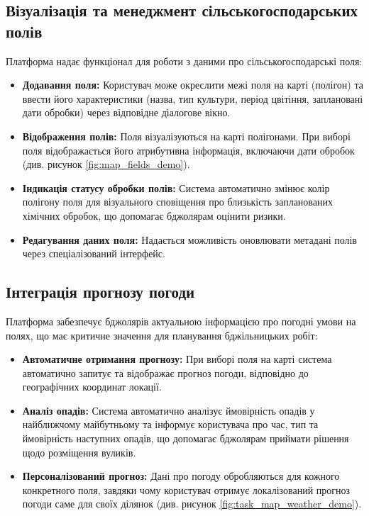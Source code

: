 
\subsection{Візуалізація та менеджмент сільськогосподарських полів}
\label{subsec:task_map_fields}
Платформа надає функціонал для роботи з даними про сільськогосподарські поля:
\begin{itemize}
    \item \textbf{Додавання поля:} Користувач може окреслити межі поля на карті (полігон) та ввести його характеристики (назва, тип культури, період цвітіння, заплановані дати обробки) через відповідне діалогове вікно.
    \item \textbf{Відображення полів:} Поля візуалізуються на карті полігонами. При виборі поля відображається його атрибутивна інформація, включаючи дати обробок (див. рисунок \ref{fig:map_fields_demo}).
    \item \textbf{Індикація статусу обробки полів:} Система автоматично змінює колір полігону поля для візуального сповіщення про близькість запланованих хімічних обробок, що допомагає бджолярам оцінити ризики.
    \item \textbf{Редагування даних поля:} Надається можливість оновлювати метадані полів через спеціалізований інтерфейс.
\end{itemize}


\subsection{Інтеграція прогнозу погоди}
\label{subsec:task_map_weather}
Платформа забезпечує бджолярів актуальною інформацією про погодні умови на полях, що має критичне значення для планування бджільницьких робіт:
\begin{itemize}
    \item \textbf{Автоматичне отримання прогнозу:} При виборі поля на карті система автоматично запитує та відображає прогноз погоди, відповідно до географічних координат локації.
    \item \textbf{Аналіз опадів:} Система автоматично аналізує ймовірність опадів у найближчому майбутньому та інформує користувача про час, тип та ймовірність наступних опадів, що допомагає бджолярам приймати рішення щодо розміщення вуликів.
    \item \textbf{Персоналізований прогноз:} Дані про погоду обробляються для кожного конкретного поля, завдяки чому користувач отримує локалізований прогноз погоди саме для своїх ділянок (див. рисунок \ref{fig:task_map_weather_demo}).
\end{itemize}

